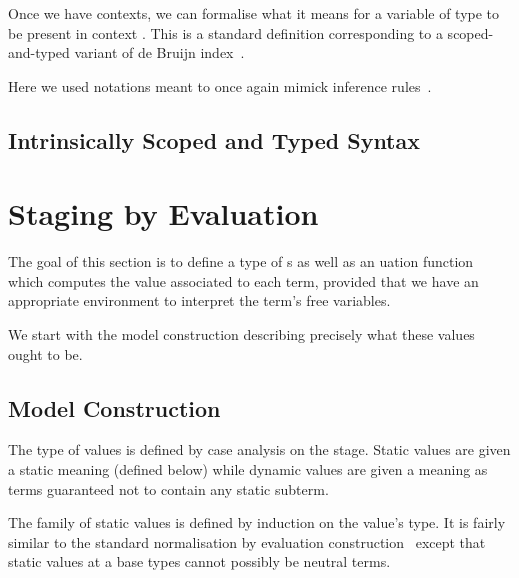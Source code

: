 \documentclass{article}
\begin{document}
Once we have contexts, we can formalise what it means
for a variable of type  to be present in context .
This is a standard definition corresponding to a scoped-and-typed
variant of de Bruijn index~\cite{de1972lambda}.


Here we used notations meant to once again mimick inference
rules~\cite{DBLP:conf/cpp/Allais0MM17}.

\subsection{Intrinsically Scoped and Typed Syntax}


\section{Staging by Evaluation}

The goal of this section is to define a type of s
as well as an uation function which computes the
value associated to each term, provided that we have an
appropriate environment to interpret the term's free variables.


We start with the model construction describing precisely
what these values ought to be.

\subsection{Model Construction}

The type of values is defined by case analysis on the stage.
%
Static values are given a static meaning (defined below)
while dynamic values are given a meaning as terms
guaranteed not to contain any static subterm.


The family of static values is defined by induction on
the value's type. It is fairly similar to the standard
normalisation by evaluation
construction~\cite{DBLP:conf/lics/BergerS91,DBLP:journals/mscs/CoquandD97,DBLP:journals/lisp/Coquand02}
except that static values at a base types cannot possibly
be neutral terms.

\begin{AgdaSuppressSpace}
\end{AgdaSuppressSpace}
\end{document}
